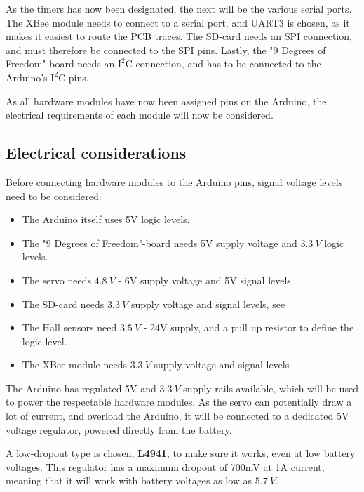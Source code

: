 As the timers has now been designated, the next will be the various serial ports. The XBee module needs to connect to a serial port, and UART3 is chosen, as it makes it easiest to route the PCB traces. The SD-card needs an SPI connection, and must therefore be connected to the SPI pins. Lastly, the "9 Degrees of Freedom"-board needs an $\text{I}^2\text{C}$ connection, and has to be connected to the Arduino's $\text{I}^2\text{C}$ pins.

As all hardware modules have now been assigned pins on the Arduino, the electrical requirements of each module will now be considered.

\subsection{Electrical considerations}

Before connecting hardware modules to the Arduino pins, signal voltage levels need to be considered:

\begin{itemize}
\item The Arduino itself uses 5V logic levels.\cite{MegaInfo}
\item The "9 Degrees of Freedom"-board needs 5V supply voltage and $\SI{3,3}{V}$ logic levels. 
\item The servo needs $\SI{4,8}{V}$ - 6V supply voltage and 5V signal levels
\item The SD-card needs $\SI{3,3}{V}$ supply voltage and signal levels, see 
\item The Hall sensors need $\SI{3,5}{V}$ - 24V supply, and a pull up resistor to define the logic level.
\item The XBee module needs $\SI{3,3}{V}$ supply voltage and signal levels
\end{itemize} 

The Arduino has regulated 5V and $\SI{3,3}{V}$ supply rails available, which will be used to power the respectable hardware modules. As the servo can potentially draw a lot of current, and overload the Arduino, it will be connected to a dedicated 5V voltage regulator, powered directly from the battery.

A low-dropout type is chosen, \textbf{L4941}, to make sure it works, even at low battery voltages. This regulator has a maximum dropout of 700mV at 1A current, meaning that it will work with battery voltages as low as $\SI{5,7}{V}$.  

